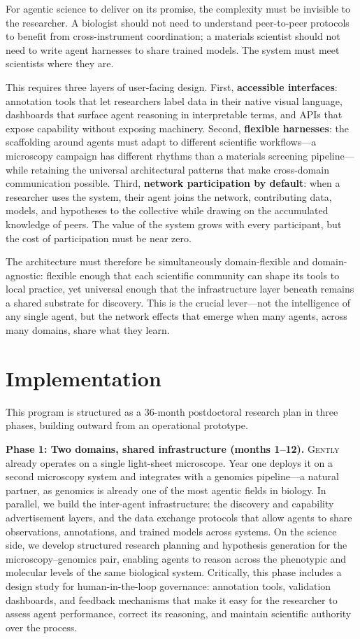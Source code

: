 \documentclass[11pt]{article}
\begin{document}
For agentic science to deliver on its promise, the complexity must be invisible to the researcher.
A biologist should not need to understand peer-to-peer protocols to benefit from cross-instrument coordination; a materials scientist should not need to write agent harnesses to share trained models.
The system must meet scientists where they are.

This requires three layers of user-facing design.
First, \textbf{accessible interfaces}: annotation tools that let researchers label data in their native visual language, dashboards that surface agent reasoning in interpretable terms, and APIs that expose capability without exposing machinery.
Second, \textbf{flexible harnesses}: the scaffolding around agents must adapt to different scientific workflows---a microscopy campaign has different rhythms than a materials screening pipeline---while retaining the universal architectural patterns that make cross-domain communication possible.
Third, \textbf{network participation by default}: when a researcher uses the system, their agent joins the network, contributing data, models, and hypotheses to the collective while drawing on the accumulated knowledge of peers.
The value of the system grows with every participant, but the cost of participation must be near zero.

The architecture must therefore be simultaneously domain-flexible and domain-agnostic: flexible enough that each scientific community can shape its tools to local practice, yet universal enough that the infrastructure layer beneath remains a shared substrate for discovery.
This is the crucial lever---not the intelligence of any single agent, but the network effects that emerge when many agents, across many domains, share what they learn.

\section{Implementation}

This program is structured as a 36-month postdoctoral research plan in three phases, building outward from an operational prototype.

\textbf{Phase 1: Two domains, shared infrastructure (months 1--12).}
\textsc{Gently} already operates on a single light-sheet microscope.
Year one deploys it on a second microscopy system and integrates with a genomics pipeline---a natural partner, as genomics is already one of the most agentic fields in biology.
In parallel, we build the inter-agent infrastructure: the discovery and capability advertisement layers, and the data exchange protocols that allow agents to share observations, annotations, and trained models across systems.
On the science side, we develop structured research planning and hypothesis generation for the microscopy--genomics pair, enabling agents to reason across the phenotypic and molecular levels of the same biological system.
Critically, this phase includes a design study for human-in-the-loop governance: annotation tools, validation dashboards, and feedback mechanisms that make it easy for the researcher to assess agent performance, correct its reasoning, and maintain scientific authority over the process.
\end{document}
